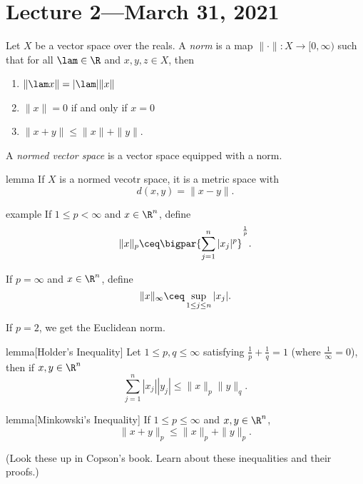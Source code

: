 \documentclass[class=article, crop=false]{standalone}
\begin{document}
\section{Lecture 2---March 31, 2021}

\begin{defn}
  Let $X$ be a vector space over the reals. A \emph{norm} is a map $\| \cdot \| \colon X \to [0,\infty)$ such that for all $\lam \in \R$ and $x,y,z \in X$, then
    \begin{enumerate}[(1)]
      \item $\| \lam x \| = |\lam| \|x\|$
      \item $\|x\|=0$ if and only if $x=0$
      \item $\|x+y\| \leq \|x\|+\|y\|$.
    \end{enumerate}

  A \emph{normed vector space} is a vector space equipped with a norm.
\end{defn}

\begin{result}{lemma}
  If $X$ is a normed vecotr space, it is a metric space with
    \[
      d(x,y) = \|x-y\|.
    \]
\end{result}

\begin{understandingcheck}{example}
  If $1 \leq p < \infty$ and $x \in \R^n$, define
    \[
      \|x\|_p\ceq \bigpar{\sum_{j=1}^{n} |x_j|^p}^{\frac{1}{p}}.
    \]

  If $p = \infty$ and $x \in \R^n$, define
    \[
      \|x\|_\infty \ceq \sup_{1 \leq j \leq n} |x_j|.
    \]

  If $p=2$, we get the Euclidean norm.
\end{understandingcheck}

\begin{result}{lemma}[Holder's Inequality]
  Let $1 \leq p,q \leq \infty$ satisfying $\frac{1}{p}+ \frac{1}{q} = 1$ (where $\frac{1}{\infty}=0$), then if $x,y \in \R^n$
    \[
      \sum_{j=1}^{n} |x_j||y_j| \leq \|x\|_p \|y\|_q.
    \]
\end{result}

\begin{result}{lemma}[Minkowski's Inequality]
  If $1 \leq p \leq \infty$ and $x,y \in \R^n$,
    \[
      \|x+y\|_p \leq \|x\|_p + \|y\|_p.
    \]
\end{result}

(Look these up in Copson's book. Learn about these inequalities and their proofs.)
\end{document}
